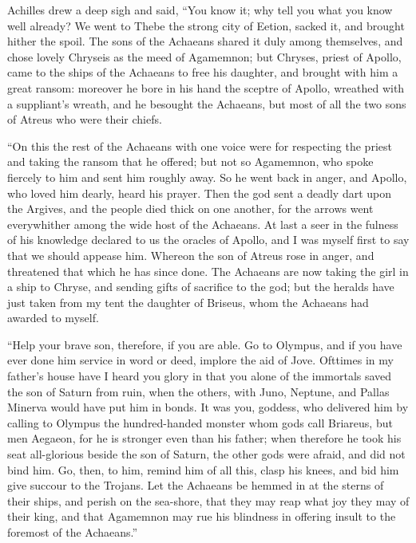 Achilles drew a deep sigh and said, “You know it; why tell you what you
know well already? We went to Thebe the strong city of Eetion, sacked it,
and brought hither the spoil. The sons of the Achaeans shared it duly
among themselves, and chose lovely Chryseis as the meed of Agamemnon; but
Chryses, priest of Apollo, came to the ships of the Achaeans to free his
daughter, and brought with him a great ransom: moreover he bore in his
hand the sceptre of Apollo, wreathed with a suppliant’s wreath, and he
besought the Achaeans, but most of all the two sons of Atreus who were
their chiefs.

“On this the rest of the Achaeans with one voice were for respecting the
priest and taking the ransom that he offered; but not so Agamemnon, who
spoke fiercely to him and sent him roughly away. So he went back in anger,
and Apollo, who loved him dearly, heard his prayer. Then the god sent a
deadly dart upon the Argives, and the people died thick on one another,
for the arrows went everywhither among the wide host of the Achaeans. At
last a seer in the fulness of his knowledge declared to us the oracles of
Apollo, and I was myself first to say that we should appease him. Whereon
the son of Atreus rose in anger, and threatened that which he has since
done. The Achaeans are now taking the girl in a ship to Chryse, and
sending gifts of sacrifice to the god; but the heralds have just taken
from my tent the daughter of Briseus, whom the Achaeans had awarded to
myself.

“Help your brave son, therefore, if you are able. Go to Olympus, and if
you have ever done him service in word or deed, implore the aid of Jove.
Ofttimes in my father’s house have I heard you glory in that you alone of
the immortals saved the son of Saturn from ruin, when the others, with
Juno, Neptune, and Pallas Minerva would have put him in bonds. It was you,
goddess, who delivered him by calling to Olympus the hundred-handed
monster whom gods call Briareus, but men Aegaeon, for he is stronger even
than his father; when therefore he took his seat all-glorious beside the
son of Saturn, the other gods were afraid, and did not bind him. Go, then,
to him, remind him of all this, clasp his knees, and bid him give succour
to the Trojans. Let the Achaeans be hemmed in at the sterns of their
ships, and perish on the sea-shore, that they may reap what joy they may
of their king, and that Agamemnon may rue his blindness in offering insult
to the foremost of the Achaeans.”

